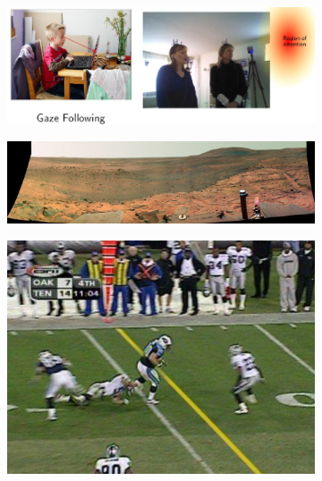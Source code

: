 \begin{figure}
  \hfill
  \begin{subfigure}[t]{0.48\textwidth}
    \centering
    \includegraphics[width=\textwidth]{img/7.png}
  \end{subfigure}
  \hfill
  \begin{subfigure}[t]{0.48\textwidth}
    \centering
    \includegraphics[width=\textwidth]{img/4.png}
  \end{subfigure}
  \hfill
  \begin{subfigure}[t]{0.48\textwidth}
    \centering
    \includegraphics[width=\textwidth]{img/3.png}
  \end{subfigure}
  \hfill
  \begin{subfigure}[t]{0.48\textwidth}
    \centering

\end{subfigure}
\end{figure}
